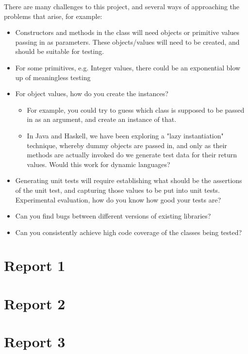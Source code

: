 There are many challenges to this project, and several ways of
approaching the problems that arise, for example:

\begin{itemize}
\item Constructors and methods in the class will need objects or primitive
  values passing in as parameters. These objects/values will need
  to be created, and should be suitable for testing.

\item For some primitives, e.g. Integer values, there could be an exponential
  blow up of meaningless testing

\item For object values, how do you create the instances?
\begin{itemize}
\item For example, you could try to guess which class is supposed to be
      passed in as an argument, and create an instance of that.
\item In Java and Haskell, we have been exploring a "lazy
      instantiation" technique, whereby dummy objects are passed in,
      and only as their methods are actually invoked do we generate
      test data for their return values. Would this work for dynamic
      languages?
\end{itemize}

\item Generating unit tests will require establishing what should be the
      assertions of the unit test, and capturing those values to be put
      into unit tests.
      Experimental evaluation, how do you know how good your tests are?

\item Can you find bugs between different versions of existing libraries?

\item Can you consistently achieve high code coverage of the classes
      being tested?
\end{itemize}
\chapter{Report 1}
\chapter{Report 2}
\chapter{Report 3}

